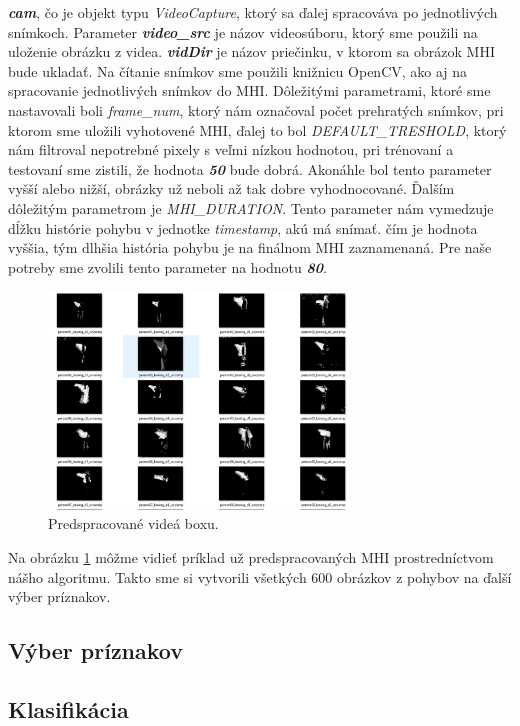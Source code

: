  \textbf{\textit{cam}}, čo je objekt typu \textit{VideoCapture}, ktorý sa ďalej spracováva po jednotlivých snímkoch. 
 Parameter \textbf{\textit{video\_src}} je názov videosúboru, ktorý sme použili na uloženie obrázku z videa.
 \textbf{\textit{vidDir}} je názov priečinku, v ktorom sa obrázok MHI bude ukladať. 
 Na čítanie snímkov sme použili knižnicu OpenCV, ako aj na spracovanie jednotlivých snímkov do MHI. Dôležitými parametrami, ktoré sme nastavovali boli \textit{frame\_num}, ktorý nám označoval počet prehratých snímkov, pri ktorom sme uložili vyhotovené MHI, ďalej to bol \textit{DEFAULT\_TRESHOLD}, ktorý nám filtroval nepotrebné pixely s veľmi nízkou hodnotou, pri trénovaní a testovaní sme zistili, že hodnota \textit{\textbf{50}} bude dobrá. Akonáhle bol tento parameter vyšší alebo nižší, obrázky už neboli až tak dobre vyhodnocované. Ďalším dôležitým parametrom je \textit{MHI\_DURATION}. Tento parameter nám vymedzuje dĺžku histórie pohybu v jednotke \textit{timestamp}, akú má snímať. čím je hodnota vyššia, tým dlhšia história pohybu je na finálnom MHI zaznamenaná. 
 Pre naše potreby sme zvolili tento parameter na hodnotu \textit{\textbf{80}}.

\begin{figure}[h]
  \centering
  \includegraphics[width=8cm]{img/MHIbox.png}
  \caption{Predspracované videá boxu.}
  \label{MHIbox}
\end{figure}  
Na obrázku \ref{MHIbox} môžme vidieť príklad už predspracovaných MHI prostredníctvom nášho algoritmu. Takto sme si vytvorili všetkých 600 obrázkov z pohybov na ďalší výber príznakov. 

\subsection{Výber príznakov}

\subsection{Klasifikácia}

